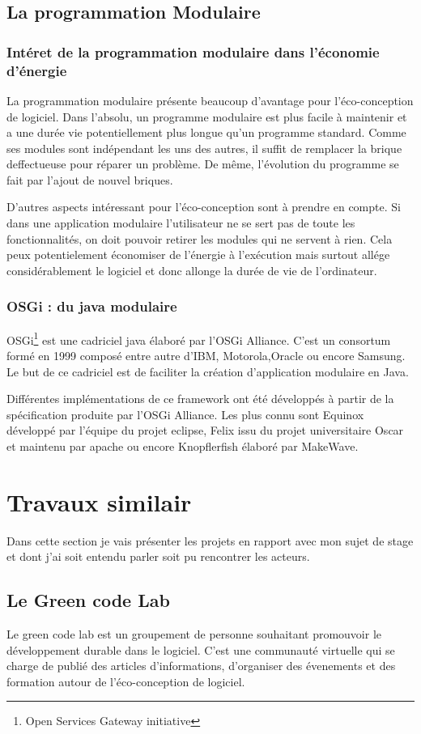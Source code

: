 \documentclass[a4paper, 11pt]{report}
\begin{document}
		\subsection{La programmation Modulaire}
			\subsubsection{Intéret de la programmation modulaire dans l'économie d'énergie}
La programmation modulaire présente beaucoup d'avantage pour l'éco-conception de logiciel. Dans l'absolu, un programme modulaire est plus facile à maintenir et a une durée vie potentiellement plus longue qu'un programme standard. Comme ses modules sont indépendant les uns des autres, il suffit de remplacer la brique deffectueuse pour réparer un problème. De même, l'évolution du programme se fait par l'ajout de nouvel briques.

D'autres aspects intéressant pour l'éco-conception sont à prendre en compte. Si dans une application modulaire l'utilisateur ne se sert pas de toute les fonctionnalités, on doit pouvoir retirer les modules qui ne servent à rien. Cela peux potentielement économiser de l'énergie à l'exécution mais surtout allége considérablement le logiciel et donc allonge la durée de vie de l'ordinateur.

			\subsubsection{OSGi : du java modulaire}
OSGi\footnote{Open Services Gateway initiative} est une cadriciel java élaboré par l'OSGi Alliance. C'est un consortum formé en 1999 composé entre autre d'IBM, Motorola,Oracle ou encore Samsung. Le but de ce cadriciel est de faciliter la création d'application modulaire en Java. 

Différentes implémentations de ce framework ont été développés à partir de la spécification produite par l'OSGi Alliance. Les plus connu sont Equinox développé par l’équipe du projet eclipse, Felix issu du projet universitaire Oscar et maintenu par apache ou encore Knopflerfish élaboré par MakeWave.
		
	\section{Travaux similair}
Dans cette section je vais présenter les projets en rapport avec mon sujet de stage et dont j'ai soit entendu parler soit pu rencontrer les acteurs.
		\subsection{Le Green code Lab}
Le green code lab est un groupement de personne souhaitant promouvoir le développement durable dans le logiciel. C'est une communauté virtuelle qui se charge de publié des articles d'informations, d'organiser des évenements et des formation autour de l'éco-conception de logiciel.
\end{document}
